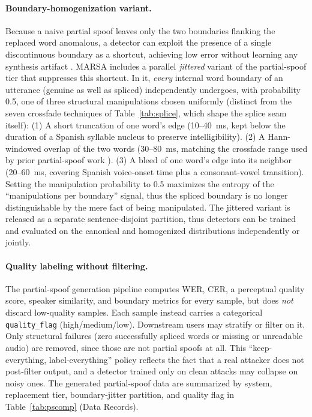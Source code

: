 \documentclass[11pt]{article}
\begin{document}
\paragraph{Boundary-homogenization variant.} Because a naive partial
spoof leaves only the two boundaries flanking the replaced word
anomalous, a detector can exploit the presence of a single discontinuous
boundary as a shortcut, achieving low error without learning any
synthesis artifact \citep{negroni2024splicing}. MARSA includes a
parallel \emph{jittered} variant of the partial-spoof tier that
suppresses this shortcut. In it, \emph{every} internal word boundary of
an utterance (genuine as well as spliced) independently undergoes, with
probability 0.5, one of three structural manipulations chosen uniformly
(distinct from the seven crossfade techniques of Table~\ref{tab:splice},
which shape the splice seam itself):
(1) A short truncation of one word's edge (10--\SI{40}{\milli\second}, kept
below the duration of a Spanish syllable nucleus to preserve
intelligibility). (2) A Hann-windowed overlap of the two words
(30--\SI{80}{\milli\second}, matching the crossfade range used by prior
partial-spoof work \citep{luong2024llama}). (3) A bleed of one word's
edge into its neighbor (20--\SI{60}{\milli\second}, covering Spanish
voice-onset time plus a consonant-vowel transition). Setting the
manipulation probability to 0.5 maximizes the entropy of the
``manipulations per boundary'' signal, thus the spliced boundary is
no longer distinguishable by the mere fact of being manipulated. The jittered variant is released as a separate
sentence-disjoint partition, thus detectors can be trained and
evaluated on the canonical and homogenized distributions independently or
jointly.

\paragraph{Quality labeling without filtering.} The partial-spoof
generation pipeline computes WER, CER, a perceptual quality score, speaker similarity, and
boundary metrics for every sample, but does \emph{not} discard
low-quality samples. Each sample instead carries a categorical
\texttt{quality\_flag} (high/medium/low). Downstream users may stratify
or filter on it. Only structural failures (zero successfully spliced
words or missing or unreadable audio) are removed, since those are
not partial spoofs at all. This ``keep-everything, label-everything''
policy reflects the fact that a real attacker does not post-filter output, and a
detector trained only on clean attacks may collapse on noisy ones.
The generated partial-spoof data are summarized by system, replacement
tier, boundary-jitter partition, and quality flag in
Table~\ref{tab:pscomp} (Data Records).
\end{document}
